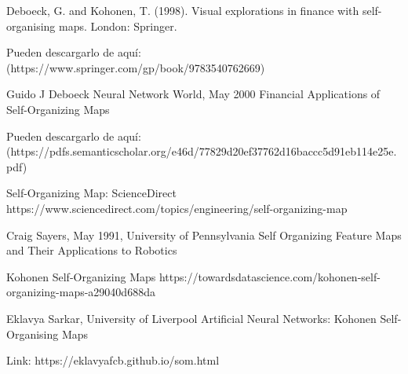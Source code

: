 \documentclass[fleqn, journal, onecolumn]{IEEEtran}             %
\theoremstyle{break}                                            %
\begin{document}
    \begin{thebibliography}{10}

        Deboeck, G. and Kohonen, T. (1998). 
        Visual explorations in finance with self-organising maps. London: Springer.

        Pueden descargarlo de aquí: (https://www.springer.com/gp/book/9783540762669)



          Guido J Deboeck
          Neural Network World, May 2000
          Financial Applications of Self-Organizing Maps

          Pueden descargarlo de aquí:  (https://pdfs.semanticscholar.org/e46d/77829d20ef37762d16baccc5d91eb114e25e.pdf)

            
        Self-Organizing Map: ScienceDirect
        https://www.sciencedirect.com/topics/engineering/self-organizing-map


        Craig Sayers, May 1991, University of Pennsylvania
        Self Organizing Feature Maps and Their Applications to Robotics


        Kohonen Self-Organizing Maps        
        https://towardsdatascience.com/kohonen-self-organizing-maps-a29040d688da

        Eklavya Sarkar, University of Liverpool
        Artificial Neural Networks: Kohonen Self-Organising Maps

        Link: https://eklavyafcb.github.io/som.html

    \end{thebibliography}
\end{document}
